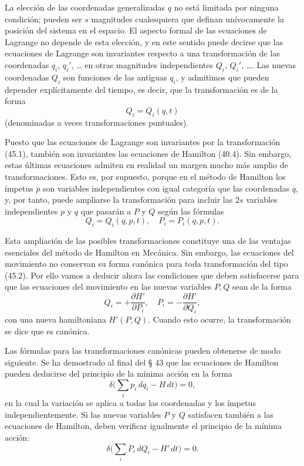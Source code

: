 \documentclass[12pt]{article}
\begin{document}
La elección de las coordenadas generalizadas \(q\) no está limitada por ninguna condición; pueden ser \(s\) magnitudes cualesquiera que definan unívocamente la posición del sistema en el espacio. El aspecto formal de las ecuaciones de Lagrange no depende de esta elección, y en este sentido puede decirse que las ecuaciones de Lagrange son invariantes respecto a una transformación de las coordenadas \(q_i\), \(q_i'\), … en otras magnitudes independientes \(Q_i\), \(Q_i'\), …. Las nuevas coordenadas \(Q_i\) son funciones de las antiguas \(q_i\), y admitimos que pueden depender explícitamente del tiempo, es decir, que la transformación es de la forma
\[
Q_i = Q_i(q,t)
\tag{45.1}
\]
(denominadas a veces transformaciones puntuales).

Puesto que las ecuaciones de Lagrange son invariantes por la transformación (45.1), también son invariantes las ecuaciones de Hamilton (40.4). Sin embargo, estas últimas ecuaciones admiten en realidad un margen mucho más amplio de transformaciones. Esto es, por supuesto, porque en el método de Hamilton los ímpetus \(p\) son variables independientes con igual categoría que las coordenadas \(q\), y, por tanto, puede ampliarse la transformación para incluir las \(2s\) variables independientes \(p\) y \(q\) que pasarán a \(P\) y \(Q\) según las fórmulas
\[
Q_i = Q_i(q,p,t), 
\quad
P_i = P_i(q,p,t).
\tag{45.2}
\]

Esta ampliación de las posibles transformaciones constituye una de las ventajas esenciales del método de Hamilton en Mecánica. Sin embargo, las ecuaciones del movimiento no conservan su forma canónica para toda transformación del tipo (45.2). Por ello vamos a deducir ahora las condiciones que deben satisfacerse para que las ecuaciones del movimiento en las nuevas variables \(P,Q\) sean de la forma
\[
\dot Q_i = +\frac{\partial H'}{\partial P_i}, 
\quad
\dot P_i = -\frac{\partial H'}{\partial Q_i},
\tag{45.3}
\]
con una nueva hamiltoniana \(H'(P,Q)\). Cuando esto ocurre, la transformación se dice que es canónica.

Las fórmulas para las transformaciones canónicas pueden obtenerse de modo siguiente. Se ha demostrado al final del § 43 que las ecuaciones de Hamilton pueden deducirse del principio de la mínima acción en la forma
\[
\delta\!\bigl(\sum_i p_i\,dq_i - H\,dt\bigr) = 0,
\tag{45.4}
\]
en la cual la variación se aplica a todas las coordenadas y los ímpetus independientemente. Si las nuevas variables \(P\) y \(Q\) satisfacen también a las ecuaciones de Hamilton, deben verificar igualmente el principio de la mínima acción:
\[
\delta\!\bigl(\sum_i P_i\,dQ_i - H'\,dt\bigr) = 0.
\tag{45.5}
\]
\end{document}

